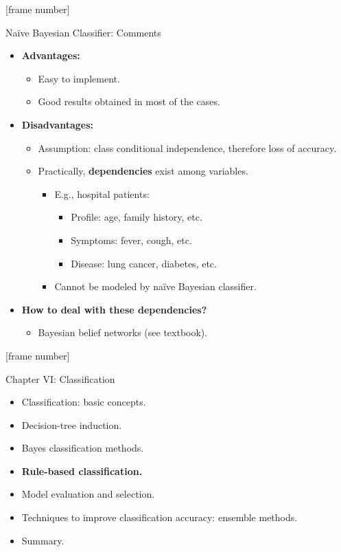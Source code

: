 \documentclass[aspectratio=169,t,table]{beamer}
\begin{document}
  {
    [frame number]
    \begin{frame}{Naïve Bayesian Classifier: Comments}
      \begin{itemize}
        \item \textbf{Advantages:}
        \begin{itemize}
          \item Easy to implement.
          \item Good results obtained in most of the cases.
        \end{itemize}
        \item \textbf{Disadvantages:}
        \begin{itemize}
          \item Assumption: class conditional independence, therefore loss of accuracy.
          \item Practically, \textbf{dependencies} exist among variables.
          \begin{itemize}
            \item E.g., hospital patients:
            \begin{itemize}
              \item Profile: age, family history, etc.
              \item Symptoms: fever, cough, etc.
              \item Disease: lung cancer, diabetes, etc.
            \end{itemize}
            \item Cannot be modeled by naïve Bayesian classifier.
          \end{itemize}
        \end{itemize}
      \item \textbf{How to deal with these dependencies?}
      \begin{itemize}
        \item Bayesian belief networks (see textbook).
      \end{itemize}
      \end{itemize}
    \end{frame}
  }

  {
    [frame number]
    \begin{frame}{Chapter VI: Classification}
        \begin{itemize}
            \item Classification: basic concepts.
            \item Decision-tree induction.
            \item Bayes classification methods.
            \item \textbf{Rule-based classification.}
            \item Model evaluation and selection.
            \item Techniques to improve classification accuracy: ensemble methods.
            \item Summary.
        \end{itemize}
    \end{frame}
  }
\end{document}
